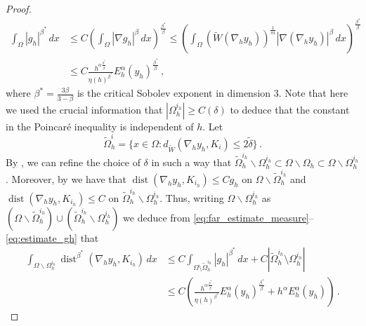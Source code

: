 \documentclass{article}
\theoremstyle{plain}
\theoremstyle{plain}
\theoremstyle{plain}
\theoremstyle{plain}
\theoremstyle{plain}
\theoremstyle{definition}
\theoremstyle{definition}
\DeclareMathOperator{\dist}{dist}
\begin{document}
\begin{proof}
\begin{equation}
\begin{aligned}
            \int_\Omega |g_h|^{\beta^\ast} \, dx & \leq C\left( \int_{\Omega} |\nabla g_{h}|^{\beta} \, dx\right)^{\frac{\beta^{\ast}}{\beta}} \leq \left( \int_{\Omega}(\widetilde W(\nabla_{h}y_{h}))^{\frac{1}{m}}|\nabla (\nabla_{h}y_{h})|^{\beta} \, dx \right)^{\frac{\beta^{\ast}}{\beta}} \\
                                                 & \leq C \frac{h^{\alpha \frac{\beta^\ast}{\beta}}}{\eta(h)^{\beta^\ast}}E_h^\alpha(y_h)^{\frac{\beta^\ast}{\beta}} \,,
        \end{aligned}
    \end{equation}
    where $\beta^\ast = \frac{3\beta}{3-\beta}$ is the critical Sobolev exponent in dimension $ 3 $. 
    Note that here we used the crucial information that $ |\Omega_{h}^{i_{h}}| \geq C(\delta) $ to deduce that the constant in the Poincar\'e inequality is independent of $ h $.
    Let
    \begin{equation}
        \tilde \Omega_h^i = \{x \in \Omega \colon d_{\widetilde W}(\nabla_h y_h, K_i) \leq 2\tilde \delta\} \,.
    \end{equation}
    By \cite[Lemma 2.6]{ALICANDRO2018}, we can refine the choice of $\delta$ in such a way that $\tilde \Omega_h^{i_h} \backslash \Omega_h^{i_h} \subset \Omega \backslash \Omega_h \subset \Omega \backslash \Omega_h^{i_h}$.
    Moreover, by \cite[Lemmas 2.5 and 2.6]{ALICANDRO2018} we have that $ \dist(\nabla_{h}y_{h}, K_{i_{h}}) \leq Cg_{h} $ on $\Omega \backslash \tilde \Omega_{h}^{i_{h}} $ and $ \dist(\nabla_{h}y_{h}, K_{i_{h}}) \leq C $ on $ \tilde \Omega_{h}^{i_{h}} \backslash \Omega_{h}^{i_{h}} $.
    Thus, writing $\Omega \backslash \Omega_h^{i_h}$ as $(\Omega \backslash \tilde \Omega_h^{i_h}) \cup (\tilde \Omega_h^{i_h} \backslash \Omega_h^{i_h})$ we deduce from \eqref{eq:far_estimate_measure}--\eqref{eq:estimate_gh} that
    \begin{equation}\label{eq:final_estimate_admlp}
        \begin{aligned}
            \int_{\Omega \backslash \Omega_h^{i_h}} \dist^{\beta^\ast}(\nabla_h y_h, K_{i_h}) \, dx & \leq C\int_{\Omega \setminus \tilde \Omega_{h}^{i_{h}}} |g_{h}|^{\beta^{\ast}} \, dx + C|\tilde \Omega_{h}^{i_{h}} \setminus \Omega_{h}^{i_{h}}| \\
                                                                                                    & \leq C\left(\frac{h^{\alpha \frac{\beta^\ast}{\beta}}}{\eta(h)^{\beta^\ast}}E_h^\alpha(y_h)^{\frac{\beta^\ast}{\beta}} + h^\alpha E_h^\alpha(y_h) \right) \,.
        \end{aligned}
    \end{equation}
    

\end{proof}
\end{document}
